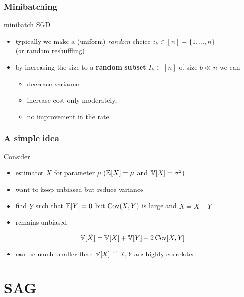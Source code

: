 \documentclass[aspectratio=149]{beamer}
\begin{document}
\begin{frame}
  \frametitle{Minibatching}
  \begin{algorithm}[H]
    \caption{minibatch SGD}
    \begin{algorithmic}[1]
      \EndFor{}
    \end{algorithmic}
  \end{algorithm}
  \begin{itemize}
    \item typically we make a (uniform) \emph{random} choice $i_k \in [n] = \{1, \dots, n\}$\\
          (or random reshuffling)
    \item by increasing the size to a \textbf{random subset} $I_k \subset [n]$ of size $b \ll n$ we can
          \begin{itemize}
            \item decrease variance
            \item increase cost only moderately,
            \item no improvement in the rate
          \end{itemize}
  \end{itemize}

\end{frame}


\begin{frame}
  \frametitle{A simple idea}
  Consider
  \begin{itemize}
    \item estimator $X$ for parameter $\mu$ ($\mathbb{E}[X]=\mu$ and $\mathbb{V}[X]=\sigma^2$)
    \item want to keep unbiased but reduce variance
    \item find $Y$ such that $\mathbb{E}[Y] = 0$ but $\operatorname*{Cov} (X,Y)$ is large and $\tilde{X}=X-Y$
    \item remains unbiased

          \begin{equation}
            \mathbb{V}[\tilde{X}] = \mathbb{V}[X]+\mathbb{V}[Y]-2\operatorname*{Cov}[X,Y]
          \end{equation}
    \item can be much smaller than $\mathbb{V}[X]$ if $X,Y$ are highly correlated
  \end{itemize}
\end{frame}

\section{SAG}%
\label{sec:}
\end{document}
